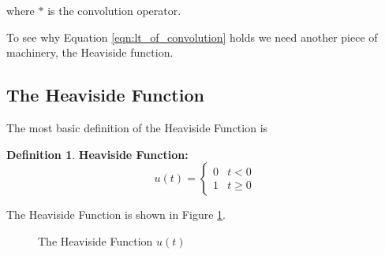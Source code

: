 \documentclass{article}
\theoremstyle{definition}
\newtheorem{definition}{Definition}[section]
\begin{document}
\bigskip
\noindent
where $\ast$ is the convolution operator.

\bigskip
\noindent
To see why Equation  \ref{eqn:lt_of_convolution} holds we need another piece of machinery, the Heaviside function.

\subsection{The Heaviside Function}
The most basic definition of the Heaviside Function is


\begin{definition} {\bf Heaviside Function:}
\bigskip
\begin{equation*}
u(t) =
 \begin{cases} 
   0 & t < 0  \\
    1 & t \geq 0
   \end{cases}
\end{equation*}
\label{def:heaviside_function}
\end{definition}

\bigskip
\noindent
The Heaviside Function is shown in Figure \ref{fig:u(t)}.


\bigskip
\begin{figure}[H]
  \centering
  \caption{The Heaviside Function $u(t)$}
  \label{fig:u(t)}
\end{figure}
\end{document}
